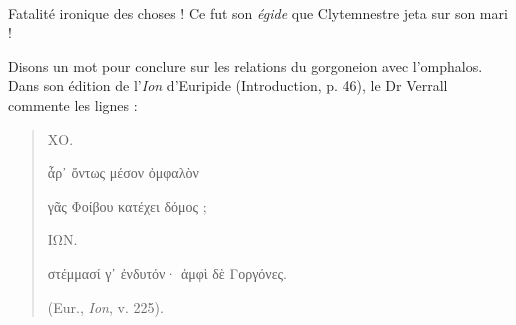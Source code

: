 \documentclass[a4paper, 11pt, oneside, polutonikogreek, french]{article}
\begin{document}
\paragraph{}
Fatalité ironique des choses ! Ce fut son \emph{égide} que Clytemnestre jeta sur son mari !

Disons un mot pour conclure sur les relations du gorgoneion avec l'omphalos. Dans son édition de l'\emph{Ion} d'Euripide (Introduction, p. 46), le Dr Verrall commente les lignes :
\begin{quotation}\normalsize
ΧΟ.

ἆρ᾽ ὄντως μέσον ὀμφαλὸν

γᾶς Φοίβου κατέχει δόμος ;

\bigskip

ΙΩΝ.

στέμμασί γ᾽ ἐνδυτόν· ἀμφὶ δὲ Γοργόνες.

(Eur., \emph{Ion}, v. 225).
\end{quotation}
\end{document}
